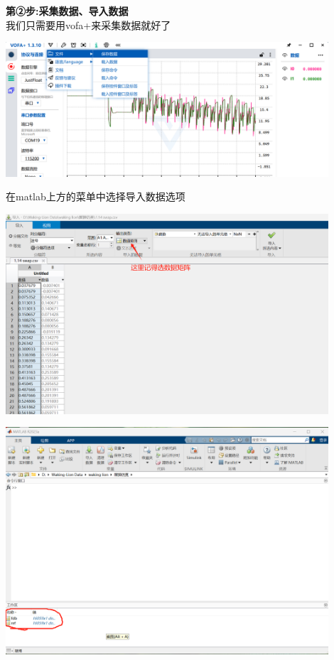 \documentclass[UTF8,a4paper,12pt]{ctexart}
\begin{document}
\begin{flushleft}
      \begin{flushleft}
        \textbf{第②步:采集数据、导入数据}\\
        我们只需要用vofa+来采集数据就好了
        \par \includegraphics[width=12cm]{picture/collection.png}
      \end{flushleft}
      \begin{flushleft}
        在matlab上方的菜单中选择导入数据选项
        \par \includegraphics[width=12cm]{picture/data_impot.png}
        \par \includegraphics[width=12cm]{picture/data_impot1.png}

\end{flushleft}
\end{flushleft}
\end{document}
